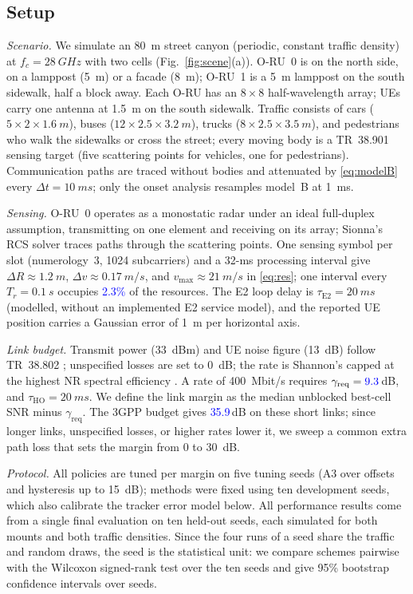 \documentclass[conference]{IEEEtran}
\newcommand{\prelim}[1]{\textcolor{blue}{#1}}
\providecommand{\numRefMargin}{\prelim{35.9}}
\providecommand{\numSNRreq}{\prelim{9.3}}
\providecommand{\numOverhead}{\prelim{2.3\%}}
\begin{document}
\subsection{Setup}
\textit{Scenario.} We simulate an \SI{80}{m} street canyon (periodic,
constant traffic density) at $f_c=\SI{28}{GHz}$ with two cells
(Fig.~\ref{fig:scene}(a)). O-RU~0 is on the north side, on a lamppost
(\SI{5}{m}) or a facade (\SI{8}{m}); O-RU~1 is a \SI{5}{m} lamppost on the
south sidewalk, half a block away. Each O-RU has an $8\times8$
half-wavelength array; UEs carry one antenna at \SI{1.5}{m} on the south
sidewalk. Traffic consists of cars ($5\times2\times\SI{1.6}{m}$), buses
($12\times2.5\times\SI{3.2}{m}$), trucks ($8\times2.5\times\SI{3.5}{m}$),
and pedestrians who walk the sidewalks or cross the street; every moving
body is a TR~38.901 sensing target \cite{3gpp38901} (five scattering
points for vehicles, one for pedestrians). Communication paths are
traced without bodies and attenuated by \eqref{eq:modelB} every
$\Delta t=\SI{10}{ms}$; only the onset analysis resamples model~B at
\SI{1}{ms}.

\textit{Sensing.} O-RU~0 operates as a monostatic radar under an ideal
full-duplex assumption, transmitting on one element and receiving on its
array; Sionna's RCS solver traces paths through the scattering points.
One sensing symbol per slot (numerology~3, 1024 subcarriers) and a
32-ms processing interval give $\Delta R\approx\SI{1.2}{m}$,
$\Delta v\approx\SI{0.17}{m/s}$, and $v_{\max}\approx\SI{21}{m/s}$ in
\eqref{eq:res}; one interval every $T_r=\SI{0.1}{s}$ occupies
\numOverhead{} of the resources. The E2 loop delay is
$\tau_{\mathrm{E2}}=\SI{20}{ms}$ (modelled, without an implemented E2
service model), and the reported UE position carries a Gaussian error of
\SI{1}{m} per horizontal axis.

\textit{Link budget.} Transmit power (\SI{33}{dBm}) and UE noise figure
(\SI{13}{dB}) follow TR~38.802 \cite{3gpp38802}; unspecified losses
\cite{3gpp38830} are set to \SI{0}{dB}; the rate is Shannon's capped at
the highest NR spectral efficiency \cite{3gpp38214}. A rate of
\SI{400}{Mbit/s} requires $\gamma_{\mathrm{req}}=\numSNRreq$\,dB, and
$\tau_{\mathrm{HO}}=\SI{20}{ms}$. We define the link margin as the median
unblocked best-cell SNR minus $\gamma_{\mathrm{req}}$. The 3GPP budget
gives \numRefMargin\,dB on these short links; since longer links,
unspecified losses, or higher rates lower it, we sweep a common extra
path loss that sets the margin from 0 to \SI{30}{dB}.

\textit{Protocol.} All policies are tuned per margin on five tuning
seeds (A3 over offsets and hysteresis up to \SI{15}{dB}); methods were
fixed using ten development seeds, which also calibrate the tracker
error model below. All performance results come from a single final
evaluation on ten held-out seeds, each simulated for both mounts and
both traffic densities. Since the four runs of a seed share the traffic
and random draws, the seed is the statistical unit: we compare schemes
pairwise with the Wilcoxon signed-rank test over the ten seeds and give
95\% bootstrap confidence intervals over seeds.
\end{document}
